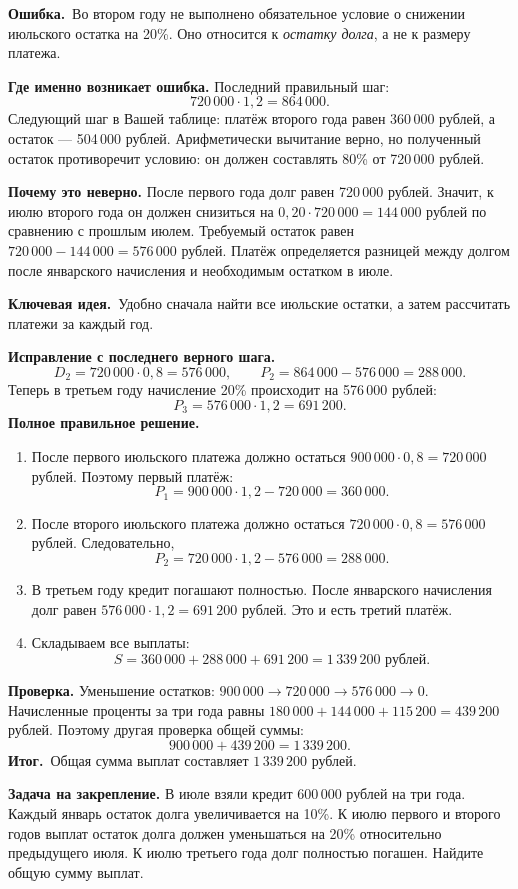\documentclass[a4paper,11pt]{article}
\newcommand{\keyidea}{\textcolor{accent}{\textbf{Ключевая идея.}}\ }
\newcommand{\errorlabel}{\textcolor{error}{\textbf{Ошибка.}}\ }
\newcommand{\result}{\textcolor{success}{\textbf{Итог.}}\ }
\begin{document}
\errorlabel Во втором году не выполнено обязательное условие о снижении июльского остатка на 20\%. Оно относится к \emph{остатку долга}, а не к размеру платежа.

\textbf{Где именно возникает ошибка.} Последний правильный шаг:
\[
720\,000\cdot 1{,}2=864\,000.
\]
Следующий шаг в Вашей таблице: платёж второго года равен 360\,000 рублей, а остаток --- 504\,000 рублей. Арифметически вычитание верно, но полученный остаток противоречит условию: он должен составлять 80\% от 720\,000 рублей.

\textbf{Почему это неверно.} После первого года долг равен 720\,000 рублей. Значит, к июлю второго года он должен снизиться на $0{,}20\cdot720\,000=144\,000$ рублей по сравнению с прошлым июлем. Требуемый остаток равен $720\,000-144\,000=576\,000$ рублей. Платёж определяется разницей между долгом после январского начисления и необходимым остатком в июле.

\keyidea Удобно сначала найти все июльские остатки, а затем рассчитать платежи за каждый год.

\textbf{Исправление с последнего верного шага.}
\[
D_2=720\,000\cdot0{,}8=576\,000,
\qquad P_2=864\,000-576\,000=288\,000.
\]
Теперь в третьем году начисление 20\% происходит на 576\,000 рублей:
\[
P_3=576\,000\cdot1{,}2=691\,200.
\]
\pagebreak[4]
\textbf{Полное правильное решение.}
\begin{enumerate}
\item После первого июльского платежа должно остаться $900\,000\cdot0{,}8=720\,000$ рублей. Поэтому первый платёж:
\[
P_1=900\,000\cdot1{,}2-720\,000=360\,000.
\]
\item После второго июльского платежа должно остаться $720\,000\cdot0{,}8=576\,000$ рублей. Следовательно,
\[
P_2=720\,000\cdot1{,}2-576\,000=288\,000.
\]
\item В третьем году кредит погашают полностью. После январского начисления долг равен $576\,000\cdot1{,}2=691\,200$ рублей. Это и есть третий платёж.
\item Складываем все выплаты:
\[
S=360\,000+288\,000+691\,200
 =\boxed{1\,339\,200\text{ рублей}}.
\]
\end{enumerate}
\textbf{Проверка.} Уменьшение остатков: $900\,000\to720\,000\to576\,000\to0$. Начисленные проценты за три года равны $180\,000+144\,000+115\,200=439\,200$ рублей. Поэтому другая проверка общей суммы:
\[
900\,000+439\,200=1\,339\,200.
\]
\result Общая сумма выплат составляет $\boxed{1\,339\,200\text{ рублей}}$.

\textbf{Задача на закрепление.} В июле взяли кредит 600\,000 рублей на три года. Каждый январь остаток долга увеличивается на 10\%. К июлю первого и второго годов выплат остаток долга должен уменьшаться на 20\% относительно предыдущего июля. К июлю третьего года долг полностью погашен. Найдите общую сумму выплат.
\end{document}
